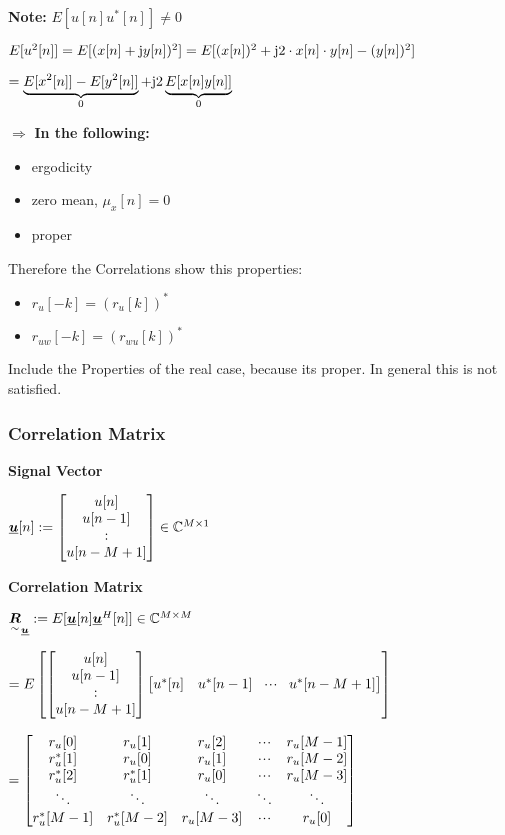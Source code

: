 \textbf{Note: } $E[u[n]u^*[n]]\neq0$

\pfeil $E[u^2[n]]=E[(x[n]+\mathrm{j} y[n])^2]=E[(x[n])^2+\mathrm{j} 2\cdot x[n]\cdot y[n]-(y[n])^2]$

\hspace{6.3cm} $=\underbrace{E[x^2[n]]-E[y^2[n]]}_0+\mathrm{j}2\underbrace{E[x[n]y[n]]}_0$

$\Rightarrow$ \textbf{In the following:} 
\begin{itemize}
\item ergodicity
\item zero mean, $\mu_x[n]=0$
\item proper
\end{itemize}\bigskip

Therefore the Correlations show this properties:  
\begin{itemize}
\item $r_u[-k]=(r_u[k])^*$
\item $r_{uw}[-k]=(r_{wu}[k])^*$
\end{itemize} 
\quad Include the Properties of the real case, because its proper. In general this is not satisfied.

\subsubsection{Correlation Matrix}
\textbf{Signal Vector}

\quad$\underline{\boldsymbol {u}}[n]:=\begin{bmatrix} u[n]\\u[n-1]\\:\\u[n-M+1] \end{bmatrix} \in\mathbb{C}^{M\times 1}$

\textbf{Correlation Matrix}

\quad $\underset{\sim}{\boldsymbol {R}}_{\underline{\boldsymbol {u}}}:=E[\underline{\boldsymbol {u}}[n]\underline{\boldsymbol {u}}^H[n]] \in\mathbb{C}^{M\times M}$

\qquad $=E\left[{
\begin{bmatrix} u[n]\\u[n-1]\\:\\u[n-M+1] \end{bmatrix}
\begin{bmatrix} u^*[n]&u^*[n-1]&\!\cdot \!\cdot\!\cdot\!&u^*[n-M+1] \end{bmatrix}}\right]$
 
\qquad $=\mat{	r_u[0]& r_u[1]& r_u[2]& \shdots&r_u[M-1]\\
				r_u^*[1]& r_u[0]& r_u[1]& \shdots&r_u[M-2]\\
				r_u^*[2]& r_u^*[1]& r_u[0]& \shdots&r_u[M-3]\\
				\ddots&\ddots&\ddots&\ddots&\ddots\\
				r_u^*[M-1]& r_u^*[M-2]& r_u[M-3]& \shdots&r_u[0]}$

